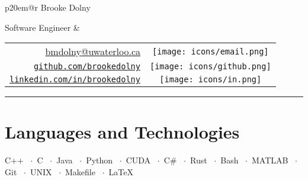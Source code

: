 \documentclass[oneside, 11pt]{memoir}
\newcommand{\TitleFont}[1]{\textnormal{\fontsize{30pt}{0}\selectfont #1}}
\newcommand{\lmr}[0]{\fontfamily{lmr}\selectfont} %
\newcommand{\LaTeXSkill}[0]{\lmr \LaTeX}
\newcommand{\spaceddot}[0]{~$\cdot$~}
\newcommand{\entrySkills}[2]{
  \begin{adjustwidth}{2.75em}{0em}%
  {\Merriweather \small #1}\spaceddot{\Merriweather \small #2}
  \end{adjustwidth}
  \vspace{-0.2em}
}
\newcommand{\github}{\texttt{[image: icons/github.png]}}
\newcommand{\linkedin}{\texttt{[image: icons/in.png]}}
\newcommand{\email}{\texttt{[image: icons/email.png]}}
\newcommand{\phone}{\texttt{[image: icons/phone.png]}}
\begin{document}
\color{textcolor}

\begin{tabular*}{\textwidth}{p{20em}@{\extracolsep{\fill}}r}%
  \TitleFont{\color{titlecolor} Brooke Dolny}

  {\textnormal{ Software Engineer}}
  &
  \begin{tabular}{rc}
    \url{bmdolny@uwaterloo.ca} & \email\\
    \href{https://github.com/brookedolny}{\texttt{github.com/brookedolny}} & \github\\
    \href{https://linkedin.com/in/brookedolny}{\texttt{linkedin.com/in/brookedolny}} & \linkedin
    \vspace{-0.08em}
    \end{tabular}%
\end{tabular*}
{\color{titlecolor} \rule{\textwidth}{0.1em}}


\section*{Languages and Technologies}
    \entrySkills{
        C++ \spaceddot C \spaceddot Java \spaceddot Python \spaceddot CUDA
        \spaceddot C\# \spaceddot Rust \spaceddot Bash \spaceddot MATLAB
    }{
        Git \spaceddot UNIX \spaceddot Makefile \spaceddot \LaTeXSkill
    }



\end{document}
